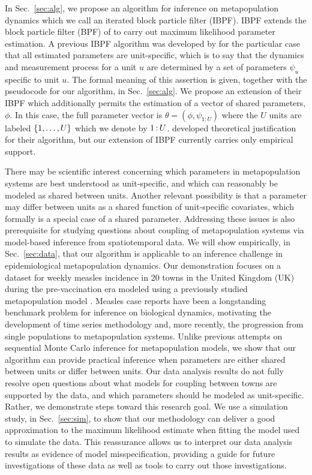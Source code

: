 \documentclass[12pt]{article}\usepackage[]{graphicx}\usepackage[]{xcolor}
\begin{document}
In Sec.~\ref{sec:alg}, we propose an algorithm for inference on metapopulation dynamics which we call an iterated block particle filter (IBPF).
IBPF extends the block particle filter (BPF) of \citet{rebeschini15} to carry out maximum likelihood parameter estimation.
A previous IBPF algorithm was developed by \citet{ning21-ibpf} for the particular case that all estimated parameters are unit-specific, which is to say that the dynamics and measurement process for a unit $u$ are determined by a set of parameters $\psi_u$ specific to unit $u$.
The formal meaning of this assertion is given, together with the pseudocode for our algorithm, in Sec.~\ref{sec:alg}.
We propose an extension of their IBPF which additionally permits the estimation of a vector of shared parameters, $\phi$.
In this case, the full parameter vector is $\theta=(\phi,\psi_{1:U})$ where the $U$ units are labeled $\{1,\dots,U\}$ which we denote by ${1}{\hspace{0.6mm}:\hspace{0.6mm}}{U}$.
\citet{ning21-ibpf} developed theoretical justification for their algorithm, but our extension of IBPF currently carries only empirical support.

There may be scientific interest concerning which parameters in metapopulation systems are best understood as unit-specific, and which can reasonably be modeled as shared between units.
Another relevant possibility is that a parameter may differ between units as a shared function of unit-specific covariates, which formally is a special case of a shared parameter.
Addressing these issues is also prerequisite for studying questions about coupling of metapopulation systems via model-based inference from spatiotemporal data.
We will show empirically, in Sec.~\ref{sec:data}, that our {\ibpf} algorithm is applicable to an inference challenge in epidemiological metapopulation dynamics.
Our demonstration focuses on a dataset for weekly measles incidence in 20 towns in the United Kingdom (UK) during the pre-vaccination era \citep{he10} modeled using a previously studied metapopulation model \citep{park20,ionides21}.
Measles case reports have been a longstanding benchmark problem for inference on biological dynamics, motivating the development of time series methodology and, more recently, the progression from single populations to metapopulation systems.
Unlike previous attempts on sequential Monte Carlo inference for metapopulation models, we show that our algorithm can provide practical inference when parameters are either shared between units or differ between units.
Our data analysis results do not fully resolve open questions about what models for coupling between towns are supported by the data, and which parameters should be modeled as unit-specific.
Rather, we demonstrate steps toward this research goal.
We use a simulation study, in Sec.~\ref{sec:sim}, to show that our methodology can deliver a good approximation to the maximum likelihood estimate when fitting the model used to simulate the data.
This reassurance allows us to interpret our data analysis results as evidence of model misspecification, providing a guide for future investigations of these data as well as tools to carry out those investigations.
\end{document}
